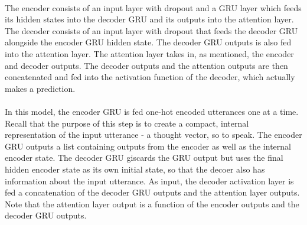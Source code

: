 \documentclass{article}
\begin{document}
\paragraph{}
The encoder consists of an input layer with dropout and a GRU
layer which feeds its hidden states into the decoder GRU and its outputs into 
the attention layer. The decoder consists of an input layer with dropout that
feeds the decoder GRU alongside the encoder GRU hidden state. The decoder GRU
outputs is also fed into the attention layer. The attention layer takes in, as
mentioned, the encoder and decoder outputs. The decoder outputs and the
attention outputs are then concatenated and fed into the activation function of
the decoder, which actually makes a prediction.

\paragraph{}
In this model, the encoder GRU is fed one-hot encoded utterances one at a
time. Recall that the purpose of this step is to create a compact, internal
representation of the input utterance - a thought vector, so to speak. The
encoder GRU outputs a list containing outputs from the encoder as well as the
internal encoder state. The decoder GRU giscards the GRU output but uses the
final hidden encoder state as its own initial state, so that the decoer also
has information about the input utterance. As input, the decoder activation
layer is fed a concatenation of the decoder GRU outputs and the attention layer
outputs. Note that the attention layer output is a function of the encoder
outputs and the decoder GRU outputs. 
\end{document}
